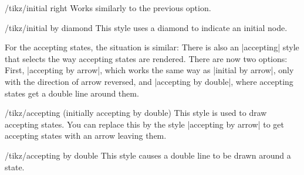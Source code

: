 \begin{stylekey}{/tikz/initial right}
    Works similarly to the previous option.
\end{stylekey}

\begin{stylekey}{/tikz/initial by diamond}
    This style uses a diamond to indicate an initial node.
\end{stylekey}

For the accepting states, the situation is similar: There is also an
|accepting| style that selects the way accepting states are rendered. There are
now two options: First, |accepting by arrow|, which works the same way as
|initial by arrow|, only with the direction of arrow reversed, and
|accepting by double|, where accepting states get a double line around them.

\begin{stylekey}{/tikz/accepting (initially accepting by double)}
    This style is used to draw accepting states. You can replace this by the
    style |accepting by arrow| to get accepting states with an arrow leaving
    them.
\end{stylekey}

\begin{stylekey}{/tikz/accepting by double}
    This style causes a double line to be drawn around a state.
\end{stylekey}

